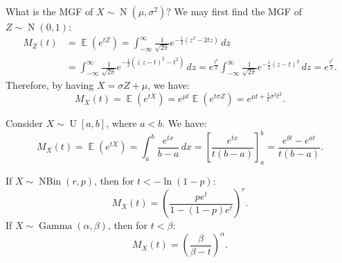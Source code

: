 \documentclass{huhtakm-template-book-v2}
\DeclareMathOperator{\E}{\mathbb{E}}
\DeclareMathOperator{\N}{N}
\DeclareMathOperator{\NBin}{NBin}
\DeclareMathOperator{\U}{U}
\DeclareMathOperator{\Gam}{Gamma}
\begin{document}
    \begin{eg}
        What is the MGF of $X \sim \N(\mu, \sigma^{2})$? We may first find the MGF of $Z \sim \N(0, 1)$:
        \begin{align*}
            M_{Z}(t) &= \E(e^{tZ}) = \int_{-\infty}^{\infty} \frac{1}{\sqrt{2\pi}} e^{-\frac{1}{2}(z^{2} - 2tz)} \, dz \\
            &= \int_{-\infty}^{\infty} \frac{1}{\sqrt{2\pi}} e^{-\frac{1}{2}((z - t)^{2} - t^{2})} \, dz = e^{\frac{t^{2}}{2}} \int_{-\infty}^{\infty} \frac{1}{\sqrt{2\pi}} e^{-\frac{1}{2}(z - t)^{2}} \, dz = e^{\frac{t^{2}}{2}}.
        \end{align*}
        Therefore, by having $X = \sigma Z + \mu$, we have:
        \begin{equation*}
            M_{X}(t) = \E(e^{tX}) = e^{\mu t} \E(e^{t\sigma Z}) = e^{\mu t + \frac{1}{2} \sigma^{2} t^{2}}.
        \end{equation*}
    \end{eg}
    \begin{eg}
        Consider $X \sim \U[a, b]$, where $a < b$. We have:
        \begin{equation*}
            M_{X}(t) = \E(e^{tX}) = \int_{a}^{b} \frac{e^{tx}}{b - a} \, dx = \left[\frac{e^{tx}}{t(b - a)}\right]_{a}^{b} = \frac{e^{bt} - e^{at}}{t(b - a)}.
        \end{equation*}
    \end{eg}
    \begin{eg}
        If $X \sim \NBin(r, p)$, then for $t < -\ln(1 - p)$:
        \begin{equation*}
            M_{X}(t) = \left(\frac{pe^{t}}{1 - (1 - p)e^{t}}\right)^{r}.
        \end{equation*}
        If $X \sim \Gam(\alpha, \beta)$, then for $t < \beta$:
        \begin{equation*}
            M_{X}(t) = \left(\frac{\beta}{\beta - t}\right)^{\alpha}.
        \end{equation*}
    \end{eg}
    \newpage
\end{document}
